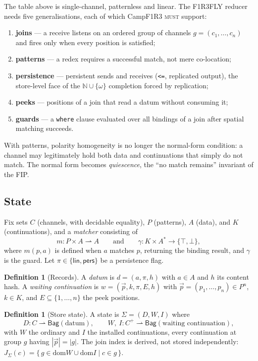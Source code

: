 \documentclass[11pt]{article}
\theoremstyle{plain}
\theoremstyle{definition}
\newtheorem{definition}[proposition]{Definition}
\newcommand{\Camp}{CampF1R3}
\newcommand{\rr}{\rightharpoonup}
\newcommand{\Bag}{\mathsf{Bag}}
\newcommand{\dom}{\mathrm{dom}}
\newcommand{\lin}{\mathsf{lin}}
\newcommand{\pers}{\mathsf{pers}}
\newcommand{\MUST}{\textsc{must}}
\newcommand{\code}[1]{\texttt{#1}}
\begin{document}
The table above is single-channel, patternless and linear. The F1R3FLY reducer
needs five generalisations, each of which \Camp{} \MUST{} support:
\begin{enumerate}[nosep]
\item \textbf{joins} --- a receive listens on an ordered group of channels
      $g=(c_1,\dots,c_n)$ and fires only when every position is satisfied;
\item \textbf{patterns} --- a redex requires a successful match, not mere
      co-location;
\item \textbf{persistence} --- persistent sends and receives (\code{<=},
      replicated output), the store-level face of the $\mathbb N\cup\{\omega\}$
      completion forced by replication;
\item \textbf{peeks} --- positions of a join that read a datum without
      consuming it;
\item \textbf{guards} --- a \code{where} clause evaluated over all bindings of a
      join after spatial matching succeeds.
\end{enumerate}
With patterns, polarity homogeneity is no longer the normal-form condition: a
channel may legitimately hold both data and continuations that simply do not
match. The normal form becomes \emph{quiescence}, the ``no match remains''
invariant of the FIP.

\subsection{State}

Fix sets $C$ (channels, with decidable equality), $P$ (patterns), $A$ (data), and
$K$ (continuations), and a \emph{matcher} consisting of
\[
  m : P\times A \rr A \qquad\text{and}\qquad \gamma : K\times A^{*}\to\{\top,\bot\},
\]
where $m(p,a)$ is defined when $a$ matches $p$, returning the binding result, and
$\gamma$ is the guard. Let $\pi\in\{\lin,\pers\}$ be a persistence flag.

\begin{definition}[Records]
A \emph{datum} is $d=(a,\pi,h)$ with $a\in A$ and $h$ its content hash. A
\emph{waiting continuation} is $w=(\vec p,k,\pi,E,h)$ with
$\vec p=(p_1,\dots,p_n)\in P^n$, $k\in K$, and $E\subseteq\{1,\dots,n\}$ the peek
positions.
\end{definition}

\begin{definition}[Store state]\label{def:state}
A state is $\Sigma=(D,W,I)$ where
\[
  D : C\rr\Bag(\text{datum}),\qquad
  W,\ I : C^{+}\rr\Bag(\text{waiting continuation}),
\]
with $W$ the ordinary and $I$ the installed continuations, every continuation at
group $g$ having $|\vec p|=|g|$. The join index is derived, not stored
independently:
$J_\Sigma(c)=\{\,g\in\dom W\cup\dom I \mid c\in g\,\}$.
\end{definition}
\end{document}
